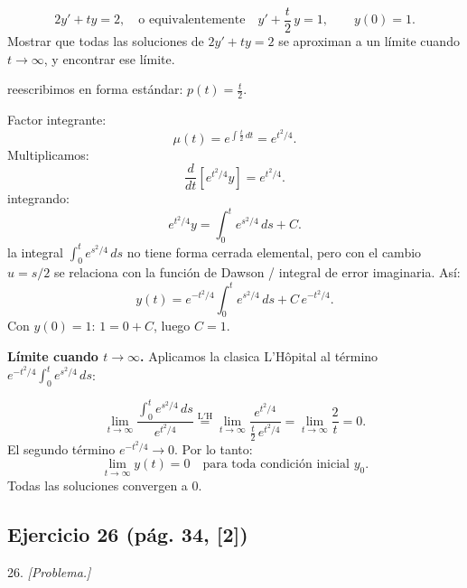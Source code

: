 \begin{respuesta}
\[
  2y' + ty = 2, \quad\text{o equivalentemente}\quad
  y' + \frac{t}{2}\,y = 1, \qquad y(0) = 1.
\]
Mostrar que todas las soluciones de $2y'+ty=2$ se aproximan a un l\'imite
cuando $t\to\infty$, y encontrar ese l\'imite.

reescribimos en forma est\'andar: $p(t) = \tfrac{t}{2}$.

Factor integrante:
\[
  \mu(t) = e^{\int \frac{t}{2}\,dt} = e^{t^2/4}.
\]
Multiplicamos:
\[
  \frac{d}{dt}\!\left[e^{t^2/4}y\right] = e^{t^2/4}.
\]
integrando:
\[
  e^{t^2/4}y = \int_0^t e^{s^2/4}\,ds + C.
\]
la integral $\displaystyle\int_0^t e^{s^2/4}\,ds$ no tiene forma cerrada elemental,
pero con el cambio $u = s/2$ se relaciona con la funci\'on de Dawson / integral de
error imaginaria. As\'i:
\[
  y(t) = e^{-t^2/4}\int_0^t e^{s^2/4}\,ds + C\,e^{-t^2/4}.
\]
Con $y(0) = 1$: $1 = 0 + C$, luego $C=1$.

\textbf{L\'imite cuando $t\to\infty$.} Aplicamos la clasica L'H\^opital al
t\'ermino $e^{-t^2/4}\int_0^t e^{s^2/4}\,ds$:

\[
  \lim_{t\to\infty} \frac{\displaystyle\int_0^t e^{s^2/4}\,ds}{e^{t^2/4}}
  \overset{\mathrm{L'H}}{=}
  \lim_{t\to\infty} \frac{e^{t^2/4}}{\tfrac{t}{2}\,e^{t^2/4}}
  = \lim_{t\to\infty} \frac{2}{t} = 0.
\]
El segundo t\'ermino $e^{-t^2/4}\to 0$. Por lo tanto:
\[
  \boxed{\lim_{t\to\infty} y(t) = 0 \quad \text{para toda condici\'on inicial } y_0.}
\]
Todas las soluciones convergen a $0$.
    \vspace{7cm}
\end{respuesta}

\subsection*{Ejercicio 26 \quad\normalfont\small(pág. 34, [2])}

\begin{enunciado}{26.}
    \textit{[Problema.]}
\end{enunciado}

